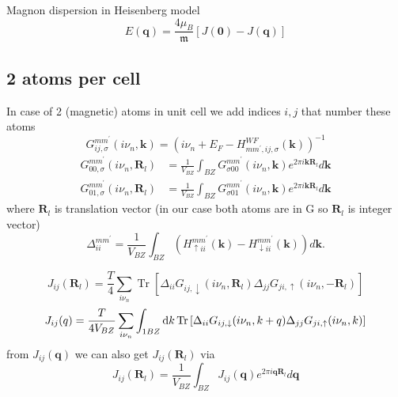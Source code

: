 \documentclass[12pt,a4paper]{article}
\begin{document}
Magnon dispersion in Heisenberg model
\[
    E(\mathbf{q})=\frac{4 \mu_B}{{\mathfrak m}}[J(\mathbf{0})-J(\mathbf{q})]
\]



\subsection{2 atoms per cell} %
\label{sub:1}
In case of 2 (magnetic) atoms in unit cell we add indices $ i, j$ that number these atoms
\[
    G_{i j, \sigma}^{m m^{\prime}}(i \nu_n, \mathbf{k})=\left(i \nu_n + E_F-H_{m m^{\prime}, i j, \sigma}^{W F}(\mathbf{k})\right)^{-1}
\]
\begin{align*}
    G_{0 0, \sigma}^{m m^{\prime}}(i \nu_n, \mathbf{R}_{l}) &= \frac{1}{V_{BZ}} \int_{B Z} G_{\sigma 0 0}^{m m^{\prime}}(i \nu_n, \mathbf{k}) e^{2 \pi i \mathbf{k} \mathbf{R}_{l}} d \mathbf{k}\\
    G_{0 1, \sigma}^{m m^{\prime}}(i \nu_n, \mathbf{R}_{l}) &= \frac{1}{V_{BZ}} \int_{B Z} G_{\sigma 0 1}^{m m^{\prime}}(i \nu_n, \mathbf{k}) e^{2 \pi i \mathbf{k} \mathbf{R}_{l}} d \mathbf{k} 
\end{align*}
where $\mathbf{R}_{l}$ is translation vector (in our case both atoms are in G so $\mathbf{R}_{l}$ is integer vector)
\begin{equation}
    \Delta_{i i}^{m m^{\prime}} = \frac{1}{V_{BZ}} \int_{B Z}\left(H_{ \uparrow i i}^{m m^{\prime}}(\mathbf{k})-H_{ \downarrow i i}^{m m^{\prime}}(\mathbf{k})\right) d \mathbf{k} .
\end{equation}

\begin{equation}
    J_{i j}(\mathbf{R}_{l})  = \frac{T}{4}  \sum_{i \nu_n} \operatorname{Tr}
    \left[\Delta_{ i i} G_{i j, \downarrow}(i \nu_n, \mathbf{R}_{l}) \Delta_{j j} G_{j i, \uparrow}(i \nu_n, -\mathbf{R}_{l}) \right]
\end{equation}
\begin{equation}
    J_{i j} (q) =  \frac{T}{4 V_{BZ}}  \sum_{i \nu_n}  \int_{1 BZ} \mathop{}\!\mathrm{d} k \operatorname{Tr}
    \left[\Delta_{ i i} G_{ i j, \downarrow}(i \nu_n, k+ q) \Delta_{j j} G_{j i, \uparrow}(i \nu_n, k) \right]
\end{equation}
from $J_{i j} (\mathbf{q})$ we can also get $J_{i j}(\mathbf{R}_{l})$ via 
\begin{equation}
    J_{i j}(\mathbf{R}_{l}) = \frac{1}{V_{BZ}} \int_{B Z} J_{i j} (\mathbf{q}) e^{2 \pi i \mathbf{q} \mathbf{R}_{l}} d \mathbf{q}
\end{equation}







\end{document}
